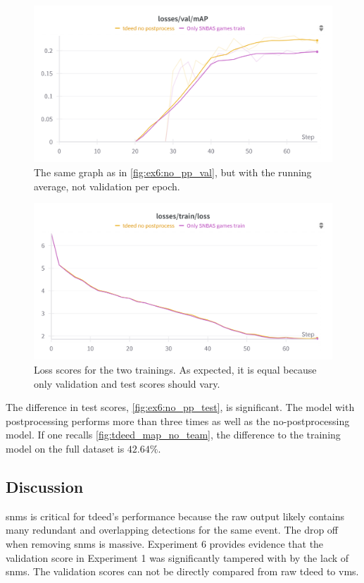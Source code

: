 \begin{figure}
    \centering
    \includegraphics[width=0.75\linewidth]{figures/no_pprocess_avg_val.png}
    \caption{The same graph as in \cref{fig:ex6:no_pp_val}, but with the running average, not validation per epoch.}
    \label{fig:ex6:no_pp_avg_val}
\end{figure}

\begin{figure}
    \centering
    \includegraphics[width=0.75\linewidth]{figures/no_pprocess_loss.png}
    \caption{Loss scores for the two trainings. As expected, it is equal because only validation and test scores should vary.}
    \label{fig:ex6:no_pp_loss}
\end{figure}

The difference in test scores, \cref{fig:ex6:no_pp_test}, is significant. The model with postprocessing performs more than three times as well as the no-postprocessing model. If one recalls \cref{fig:tdeed_map_no_team}, the difference to the training model on the full dataset is $42.64\%$. 

\subsection{Discussion}
\label{ssec:ex6_discussion}


\acrfull{snms} is critical for \acrshort{tdeed}'s performance because the raw output likely contains many redundant and overlapping detections for the same event. The drop off when removing \acrshort{snms} is massive. Experiment 6 provides evidence that the validation score in Experiment 1 was significantly tampered with by the lack of \acrshort{snms}. The validation scores can not be directly compared from raw \acrshort{tdeed} to \acrshort{vms}. 

